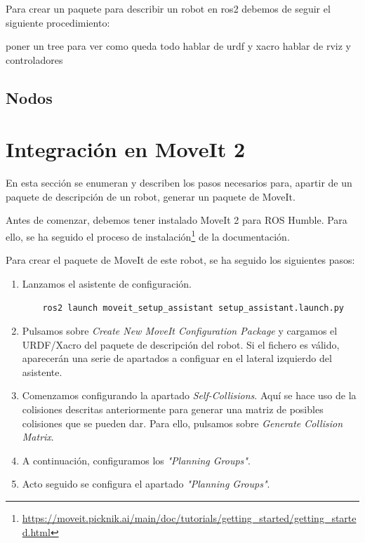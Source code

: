 Para crear un paquete para describir un robot en ros2 debemos de seguir el siguiente procedimiento:



poner un tree para ver como queda todo 
hablar de urdf y xacro
hablar de rviz y controladores



\subsection{Nodos}


\newpage
\section{Integración en MoveIt 2}
\noindent En esta sección se enumeran y describen los pasos necesarios para, apartir de un paquete de descripción de un robot, generar 
un paquete de MoveIt.

Antes de comenzar, debemos tener instalado MoveIt 2 para ROS Humble. Para ello, se ha seguido el proceso de 
instalación\footnote{\url{https://moveit.picknik.ai/main/doc/tutorials/getting_started/getting_started.html}} de la documentación.

Para crear el paquete de MoveIt de este robot, se ha seguido los siguientes pasos:
\begin{enumerate}
\item Lanzamos el asistente de configuración.
\begin{verbatim}
    ros2 launch moveit_setup_assistant setup_assistant.launch.py
\end{verbatim}
\item Pulsamos sobre \textit{\guillemotleft Create New MoveIt Configuration Package\guillemotright} y cargamos el URDF/Xacro del paquete de descripción 
del robot. Si el fichero es válido, aparecerán una serie de apartados a configuar en el lateral izquierdo del asistente. 
\item Comenzamos configurando la apartado \textit{\guillemotleft Self-Collisions\guillemotright}. Aquí se hace uso de la colisiones 
descritas anteriormente para generar una matriz de posibles colisiones que se pueden dar. Para ello, pulsamos sobre
 \textit{\guillemotleft Generate Collision Matrix\guillemotright}.
\item A continuación, configuramos los \textit{"Planning Groups"}. 
\item Acto seguido se configura el apartado \textit{"Planning Groups"}. 

\end{enumerate}


